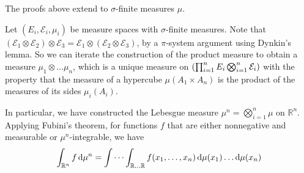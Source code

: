 \begin{remark}
	The proofs above extend to \( \sigma \)-finite measures \( \mu \).

	Let \( (E_i, \mathcal E_i, \mu_i) \) be measure spaces with \( \sigma \)-finite measures.
	Note that \( (\mathcal E_1 \otimes \mathcal E_2) \otimes \mathcal E_3 = \mathcal E_1 \otimes (\mathcal E_2 \otimes \mathcal E_3) \), by a \( \pi \)-system argument using Dynkin's lemma.
	So we can iterate the construction of the product measure to obtain a measure \( \mu_1 \otimes \dots \mu_n \), which is a unique measure on \( \qty(\prod_{i=1}^n E_i \bigotimes_{i=1}^n \mathcal E_i) \) with the property that the measure of a hypercube \( \mu(A_1 \times A_n) \) is the product of the measures of its sides \( \mu_i(A_i) \).

	In particular, we have constructed the Lebesgue measure \( \mu^n = \bigotimes_{i=1}^n \mu \) on \( \mathbb R^n \).
	Applying Fubini's theorem, for functions \( f \) that are either nonnegative and measurable or \( \mu^n \)-integrable, we have
	\[ \int_{\mathbb R^n} f \dd{\mu^n} = \idotsint_{\mathbb R \dots \mathbb R} f(x_1, \dots, x_n) \dd{\mu(x_1)} \dots \dd{\mu(x_n)} \]
\end{remark}

